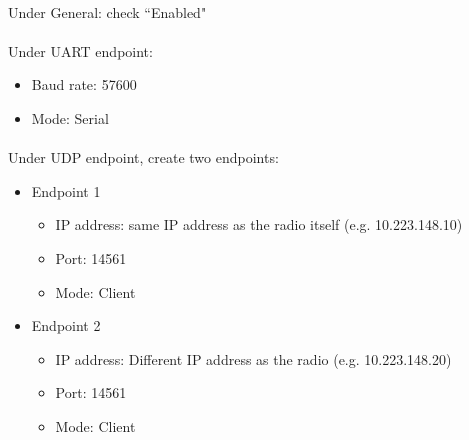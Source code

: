                 \paragraph{} Under General: check ``Enabled"
                \paragraph{} Under UART endpoint:
                    \begin{itemize}
                        \item Baud rate: 57600
                        \item Mode: Serial
                    \end{itemize}
                \paragraph{} Under UDP endpoint, create two endpoints: 
                    \begin{itemize}
                        \item Endpoint 1
                            \begin{itemize}
                                \item IP address: same IP address as the radio itself (e.g. 10.223.148.10)
                                \item Port: 14561
                                \item Mode: Client
                            \end{itemize} 
                        \item Endpoint 2
                            \begin{itemize}
                                \item IP address: Different IP address as the radio (e.g. 10.223.148.20)
                                \item Port: 14561
                                \item Mode: Client
                            \end{itemize} 
                    
                    \end{itemize}

